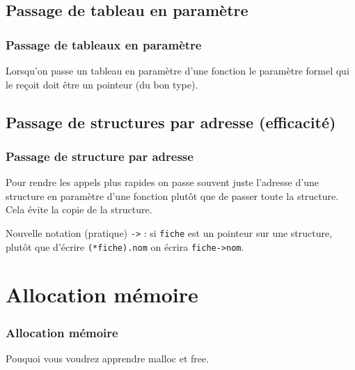 \documentclass[xcolor=pdftex,svgnames,table]{beamer}
\begin{document}
\subsection{Passage de tableau en paramètre}
\begin{frame}
  \frametitle{Passage de tableaux en paramètre}
  Lorsqu'on passe un tableau en paramètre d'une fonction le paramètre
  formel qui le reçoit doit être un pointeur (du bon type).
\end{frame}



\subsection{Passage de structures par adresse (efficacité)}
\begin{frame}[fragile]
  \frametitle{Passage de structure par adresse}
  Pour rendre les appels plus rapides on passe souvent juste l'adresse
  d'une structure en paramètre d'une fonction plutôt que de passer
  toute la structure. Cela évite la copie de la structure.

  Nouvelle notation (pratique) \verb+->+ : si \verb+fiche+ est un pointeur
  sur une structure, plutôt que d'écrire \verb+(*fiche).nom+ on écrira \verb+fiche->nom+.
\end{frame}

\section{Allocation mémoire}
\begin{frame}
  \frametitle{Allocation mémoire}
  Pouquoi vous voudrez apprendre malloc et free.
\end{frame}

\end{document}
